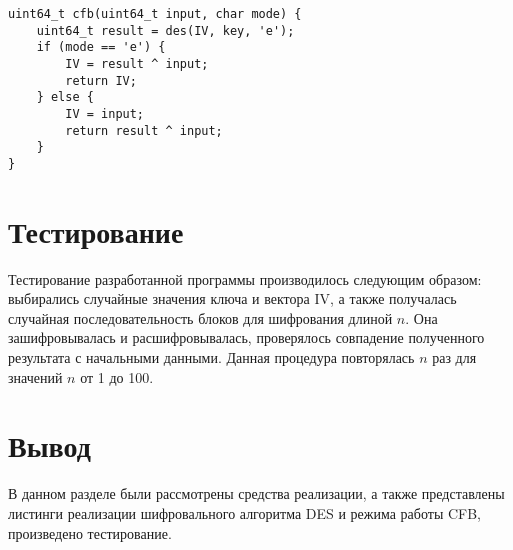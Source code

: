 \begin{center}
    \captionsetup{justification=raggedright,singlelinecheck=off}
    \begin{lstlisting}[label=lst:cfb,caption=Реализация режима работы CFB]
uint64_t cfb(uint64_t input, char mode) {
    uint64_t result = des(IV, key, 'e');
    if (mode == 'e') {
        IV = result ^ input;
        return IV;
    } else {
        IV = input;
        return result ^ input;
    }
}
\end{lstlisting}
\end{center}

\section{Тестирование}

Тестирование разработанной программы производилось следующим образом: выбирались случайные значения ключа и вектора IV, а также получалась случайная последовательность блоков для шифрования длиной $n$. Она зашифровывалась и расшифровывалась, проверялось совпадение полученного результата с начальными данными. Данная процедура повторялась $n$ раз для значений $n$ от 1 до 100.


\section*{Вывод}

В данном разделе были рассмотрены средства реализации, а также представлены листинги реализации шифровального алгоритма DES и режима работы CFB,  произведено тестирование.

